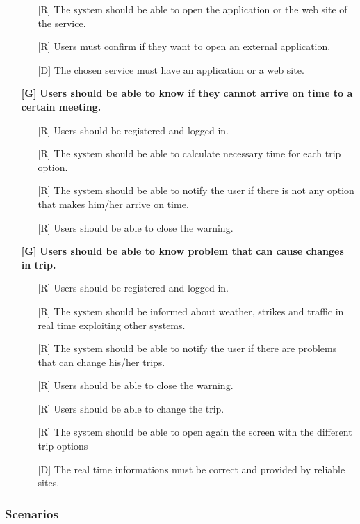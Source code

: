 \documentclass[12pt,titlepage]{article}
\begin{document}
\begin{itemize}
\begin{itemize}
\item[{[R\ped{2}]}]  The system should be able to open the application or the web site of the service.
\item[{[R\ped{3}]}] Users must confirm if they want to open an external application.
\item[{[D\ped{1}]}]  The chosen service must have an application or a web site.
\end{itemize}
\item[\textbf{ {[G\ped{11}]}}]	\textbf{	Users should be able to know if they cannot arrive on time to a certain meeting.}
\begin{itemize}
\item[{[R\ped{1}]}]  Users should be registered and logged in.
\item[{[R\ped{2}]}] The system should be able to calculate necessary time for each trip option.
\item[{[R\ped{3}]}]  The system should be able to notify the user if there is not any option that makes him/her arrive on time.
\item[{[R\ped{4}]}] Users should be able to close the warning.
\end{itemize}
\item[\textbf{ {[G\ped{11}]}}]	\textbf{	Users should be able to know problem that can cause changes in trip.}
\begin{itemize}
\item[{[R\ped{1}]}]  Users should be registered and logged in.
\item[{[R\ped{2}]}] The system should be informed about weather, strikes and traffic in real time exploiting other systems.
\item[{[R\ped{3}]}]  The system should be able to notify the user if there are problems that can change his/her trips.
\item[{[R\ped{4}]}] Users should be able to close the warning.
\item[{[R\ped{5}]}] Users should be able to change the trip.
\item[{[R\ped{6}]}]  The system should be able to open again the screen with the different trip options
\item[{[D\ped{1}]}]  The real time informations must be correct and provided by reliable sites.
\end{itemize}
\end{itemize}
\subsubsection{Scenarios}\label{sec:mod1}
\end{document}
